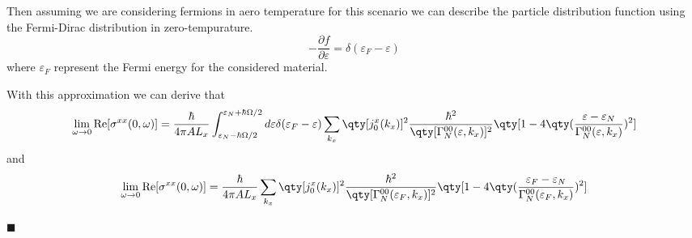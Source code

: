 \noindent
Then assuming we are considering fermions in aero temperature for this scenario we can describe the particle distribution function using the Fermi-Dirac distribution in zero-tempurature.
\begin{equation} \label{6.18}
    -\frac{\partial f}{\partial \varepsilon} = \delta(\varepsilon_F - \varepsilon)
\end{equation}
where $\varepsilon_F$ represent the Fermi energy for the considered material.

\noindent
With this approximation we can derive that
\begin{equation} \label{6.19}
  \begin{aligned}
    \lim_{\omega \to 0}
    \text{Re}[{\sigma}^{xx}(0,\omega)] =
    \frac{\hbar}{4\pi A L_x}
    \int_{\varepsilon_N - \hbar\Omega/2}^{\varepsilon_N + \hbar\Omega/2} d\varepsilon
    \delta(\varepsilon_F - \varepsilon)
    \sum_{{k_x}}
    \qty[{j}^x_0({k_x})]^2
    \frac{\hbar^2}
    {\qty[\Gamma^{00}_{N}(\varepsilon,k_x)]^2}
    \qty[
      1 -
      4\qty(\frac{{\varepsilon}-{\varepsilon_N}}{\Gamma^{00}_{N}(\varepsilon,k_x)})^2
    ]
  \end{aligned}
\end{equation}
and
\begin{equation} \label{6.20}
  \begin{aligned}
    \lim_{\omega \to 0}
    \text{Re}[{\sigma}^{xx}(0,\omega)] =
    \frac{\hbar}{4\pi A L_x}
    \sum_{{k_x}}
    \qty[{j}^x_0({k_x})]^2
    \frac{\hbar^2}
    {\qty[\Gamma^{00}_{N}(\varepsilon_F,k_x)]^2}
    \qty[
      1 -
      4\qty(\frac{{\varepsilon_F}-{\varepsilon_N}}{\Gamma^{00}_{N}(\varepsilon_F,k_x)})^2
    ]
  \end{aligned}
\end{equation}


























\hfill$\blacksquare$
